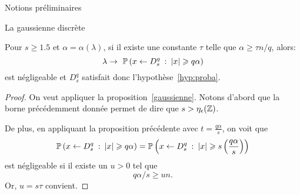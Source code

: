 \begin{section}{Notions préliminaires}
\begin{subsection}{La gaussienne discrète}
\begin{prop}
\label{gaussienne_alpha}
Pour $s \geqslant 1.5$ et $\alpha = \alpha(\lambda)$, si il existe une constante $\tau$
telle que $\alpha \geqslant \tau n/q$, alors:
\[\lambda \rightarrow  \PP\left(x\leftarrow D^q_s\: : \: |x|\geqslant q \alpha \right)\]	
est négligeable et $D^q_s$ satisfait donc l'hypothèse~\ref{hyp:proba}.
\end{prop}
\begin{proof}
On veut appliquer la proposition~\ref{gaussienne}.
Notons d'abord que la borne précédemment donnée 
permet de dire que $s > \eta_{\epsilon}(\mathbb{Z})$.

De plus, en appliquant la proposition précédente avec $t = \frac{q\alpha}{s}$, on voit que 
\begin{align*}
\mathbb{P}\left(x\leftarrow D^q_s\: : \: |x|\geqslant q \alpha \right) =
\mathbb{P}\left(x\leftarrow D^q_s\: : \: |x|\geqslant s \left(\frac{q \alpha}{s}\right)  \right)
\end{align*}
est négligeable si il
existe un $u > 0$ tel que
\[q \alpha / s \geq u n.\]
Or, $u = s\tau$ convient.
\end{proof}

	\end{subsection} %
\end{section}
